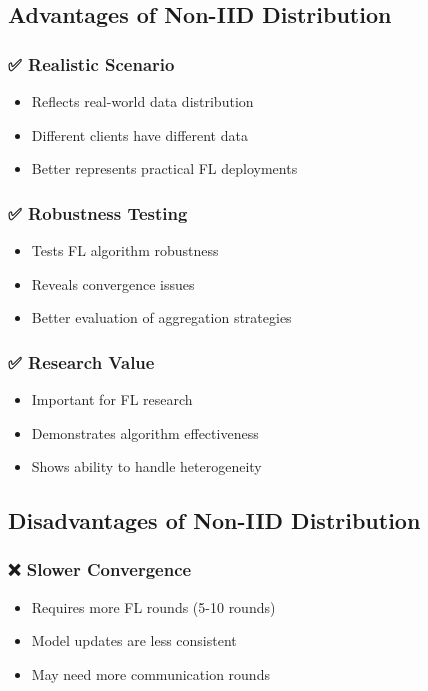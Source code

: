 \documentclass[12pt,a4paper]{article}
\begin{document}
\subsection{Advantages of Non-IID Distribution}

\subsubsection{✅ Realistic Scenario}
\begin{itemize}
    \item Reflects real-world data distribution
    \item Different clients have different data
    \item Better represents practical FL deployments
\end{itemize}

\subsubsection{✅ Robustness Testing}
\begin{itemize}
    \item Tests FL algorithm robustness
    \item Reveals convergence issues
    \item Better evaluation of aggregation strategies
\end{itemize}

\subsubsection{✅ Research Value}
\begin{itemize}
    \item Important for FL research
    \item Demonstrates algorithm effectiveness
    \item Shows ability to handle heterogeneity
\end{itemize}

\subsection{Disadvantages of Non-IID Distribution}

\subsubsection{❌ Slower Convergence}
\begin{itemize}
    \item Requires more FL rounds (5-10 rounds)
    \item Model updates are less consistent
    \item May need more communication rounds
\end{itemize}
\end{document}
